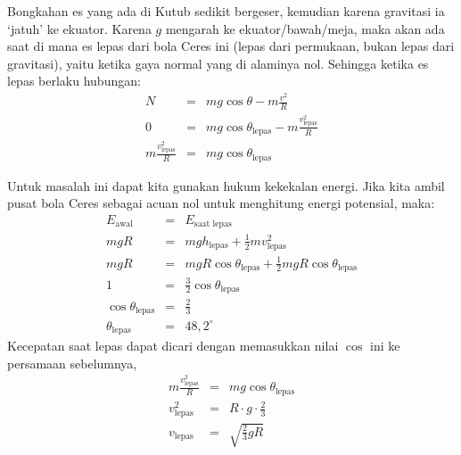 \documentclass[11pt,fleqn]{exam}
\begin{document}
\begin{questions}
\begin{enumerate}[(1).]
Bongkahan es yang ada di Kutub sedikit bergeser, kemudian karena gravitasi ia `jatuh' ke ekuator. Karena $g$ mengarah ke ekuator/bawah/meja, maka akan ada saat di mana es lepas dari bola Ceres ini (lepas dari permukaan, bukan lepas dari gravitasi), yaitu ketika gaya normal yang di alaminya nol. Sehingga ketika es lepas berlaku hubungan:
\begin{eqnarray*}
N &=& mg \cos{\theta} - m \frac{v^2}{R}\\
0 &=& mg \cos{\theta_{\text{lepas}}} - m \frac{v_{\text{lepas}}^2}{R}\\
m \frac{v_{\text{lepas}}^2}{R} &=& mg \cos{\theta_{\text{lepas}}}
\end{eqnarray*}

Untuk masalah ini dapat kita gunakan hukum kekekalan energi. Jika kita ambil pusat bola Ceres sebagai acuan nol untuk menghitung energi potensial, maka:
\begin{eqnarray*}
E_{\text{awal}} &=& E_{\text{saat lepas}}\\
mgR &=& mgh_{\text{lepas}} + \frac{1}{2} m v_{\text{lepas}}^2\\
mgR &=& mgR\cos{\theta_{\text{lepas}}} + \frac{1}{2} mgR\cos{\theta_{\text{lepas}}}\\
1 &=& \frac{3}{2} \cos{\theta_{\text{lepas}}}\\
\cos{\theta_{\text{lepas}}} &=& \frac{2}{3}\\
\theta_{\text{lepas}} &=& 48,2^{\circ}
\end{eqnarray*}
Kecepatan saat lepas dapat dicari dengan memasukkan nilai $\cos$ ini ke persamaan sebelumnya,
\begin{eqnarray*}
m \frac{v_{\text{lepas}}^2}{R} &=& mg \cos{\theta_{\text{lepas}}}\\
v_{\text{lepas}}^2 &=& R \cdot g \cdot \frac{2}{3}\\
v_{\text{lepas}} &=& \sqrt{\frac{2}{3} g R}
\end{eqnarray*}


\end{enumerate}
\end{questions}
\end{document}
